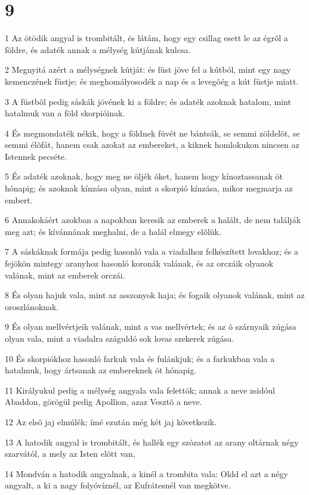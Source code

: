 \chapter{9}

\par 1 Az ötödik angyal is trombitált, és látám, hogy egy csillag esett le az égrõl a földre, és adaték annak a mélység kútjának kulcsa.
\par 2 Megnyitá azért a mélységnek kútját: és füst jöve fel a kútból, mint egy nagy kemenczének füstje; és meghomályosodék a nap és a levegõég a kút füstje miatt.
\par 3 A füstbõl pedig sáskák jövének ki a földre; és adaték azoknak hatalom, mint hatalmuk van a föld skorpióinak.
\par 4 És megmondaték nékik, hogy a földnek füvét ne bántsák, se semmi zöldelõt, se semmi élõfát, hanem csak azokat az embereket, a kiknek homlokukon nincsen az Istennek pecséte.
\par 5 És adaték azoknak, hogy meg ne öljék õket, hanem hogy kínoztassanak öt hónapig; és azoknak kínzása olyan, mint a skorpió kínzása, mikor megmarja az embert.
\par 6 Annakokáért azokban a napokban keresik az emberek a halált, de nem találják meg azt; és kívánnának meghalni, de a halál elmegy elõlük.
\par 7 A sáskáknak formája pedig hasonló vala a viadalhoz felkészített lovakhoz; és a fejökön mintegy aranyhoz hasonló koronák valának, és az orczáik olyanok valának, mint az emberek orczái.
\par 8 És olyan hajuk vala, mint az asszonyok haja; és fogaik olyanok valának, mint az oroszlánoknak.
\par 9 És olyan mellvértjeik valának, mint a vas mellvértek; és az õ szárnyaik zúgása olyan vala, mint a viadalra száguldó sok lovas szekerek zúgása.
\par 10 És skorpiókhoz hasonló farkuk vala és fulánkjuk; és a farkukban vala a hatalmuk, hogy ártsanak az embereknek öt hónapig.
\par 11 Királyukul pedig a mélység angyala vala felettök; annak a neve zsidóul Abaddon, görögül pedig Apollion, azaz Vesztõ a neve.
\par 12 Az elsõ jaj elmúlék; ímé ezután még két jaj következik.
\par 13 A hatodik angyal is trombitált, és hallék egy szózatot az arany oltárnak négy szarvától, a mely az Isten elõtt van,
\par 14 Mondván a hatodik angyalnak, a kinél a trombita vala: Oldd el azt a négy angyalt, a ki a nagy folyóvíznél, az Eufrátesnél van megkötve.
